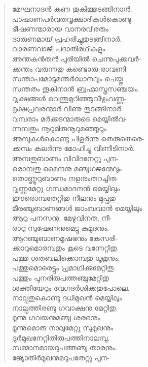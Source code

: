 \begin{verse}
മേഘനാദന്‍ കണ തൂകിത്തുടങ്ങിനാന്‍.\\
പാഷാണപര്‍വതവൃക്ഷാദികള്‍കൊണ്ടു\\
ഭീഷണന്മാരായ വാനരവീരരും\\
ദാരുണമായ് പ്രഹരിച്ചുതുടങ്ങിനാര്‍.\\
വാരണവാജി പദാതിരഥികളും\\
അന്തകന്‍തന്‍ പുരിയില്‍ ചെന്നുപുക്കവര്‍-\\
ക്കന്തം വരുന്നതു കണ്ടൊരു രാവണി\\
സന്താപമോടുമന്തര്‍ദ്ധാനവും ചെയ്തു\\
സന്തതം തൂകിനാന്‍ ബ്രഹ്മാസ്ത്രസഞ്ചയം.\\
വൃക്ഷങ്ങള്‍ വെന്തുമുറിഞ്ഞുവീഴുംവണ്ണ-\\
മൃക്ഷപ്രവരന്മാര്‍ വീണു തുടങ്ങിനാര്‍.\\
വമ്പരാം മര്‍ക്കടന്മാരുടെ മെയ്യില്‍വ-\\
ന്നമ്പതും നൂറുമിരുനൂറുമഞ്ഞൂറും\\
അമ്പുകള്‍കൊണ്ടു പിളര്‍ന്നു തെരുതെരെ-\\
ക്കമ്പം കലര്‍ന്നു മോഹിച്ചു വീണീടിനാര്‍.\\
അമ്പതുബാണം വിവിദനേറ്റൂ പുന-\\
രൊമ്പതു മൈന്ദനു മഞ്ചുഗജന്മേലും\\
തൊണ്ണൂറുബാണം നളനുംതറച്ചിത-\\
വ്വണ്ണമേറ്റു ഗന്ധമാദനന്‍ മെയ്യിലും\\
ഈരൊമ്പതേറ്റിതു നീലനും മുപ്പതു-\\
മീരഞ്ചുബാണങ്ങള്‍ ജാംബവാന്‍ മെയ്യിലും\\
ആറു പനസനു, മേഴുവിനത, നീ-\\
രാറു സുഷേണനുമെട്ടു കുമുദനും.\\
ആറഞ്ചുബാണമൃഷഭനും കേസരി-\\
ക്കാറുമൊരമ്പതും കൂടെ വന്നേറ്റിതു.\\
പത്തു ശതബലിക്കൊമ്പതു ധൂമ്രനും,\\
പത്തുമൊരെട്ടും പ്രമാഥിക്കുമേറ്റിതു.\\
പത്തും പുനരിരുപത്തഞ്ചുമേറ്റിതു\\
ശക്തിയേറും വേഗദര്‍ശിക്കതുപോലെ.\\
നാല്പതുകൊണ്ടു ദധിമുഖന്‍ മെയ്യിലും\\
നാല്പത്തിരണ്ടു ഗവാക്ഷനു മേറ്റിതു.\\
മൂന്നു ഗവയനുമഞ്ചു ശരഭനും\\
മൂന്നുമൊരു നാലുമേറ്റൂ സുമുഖനും\\
ദുര്‍മുഖനേറ്റിതിരുപത്തിനാലമ്പു,\\
സമ്മാനമായറുപത്തഞ്ചു താരനും.\\
ജ്യോതിര്‍മുഖനുമറുപതേറ്റു പുന-\\

\end{verse}
